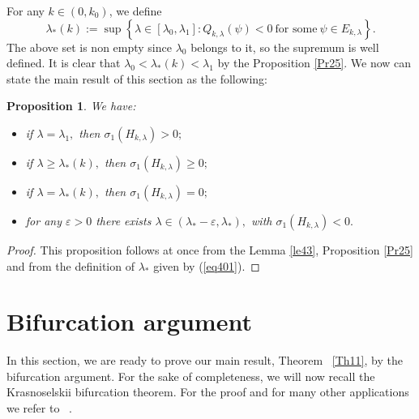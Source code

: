 \documentclass[reqno]{amsart}
\newtheorem{proposition}[theorem]{Proposition}
\def\e{\varepsilon}
\numberwithin{equation}{section}
\newenvironment{key words}{\textbf{Keywords}\mbox{  }}{ }
\begin{document}
For any $k \in (0, k_0)$, we define
\begin{equation}\label{eq401}
\lambda_{\ast}(k):=\sup\left\{\lambda\in[\lambda_{0},\lambda_{1}]:Q_{k, \lambda}(\psi)< 0 ~\mbox
{for some}~\psi\in E_{k, \lambda}\right\}.
\end{equation}
The above set is non empty since $\lambda_0 $ belongs to it, so the supremum is well defined. It is clear that $\lambda_{0}<\lambda_{\ast}(k)<\lambda_{1}$ by the Proposition \ref{Pr25}. We now can state the main result of this section as the following:
\begin{proposition} \label{Pr41}
We have:
\begin{itemize}
		\item[(i)] if $\lambda=\lambda_{1},$ then $\sigma_{1}(H_{k, \lambda})>0;$
        \item[(ii)] if $\lambda \geq \lambda_{\ast}(k),$ then $\sigma_{1}(H_{k, \lambda}) \geq 0;$
        \item[(iii)] if $\lambda = \lambda_{\ast}(k),$ then $\sigma_{1}(H_{k, \lambda}) = 0;$
		\item[(iv)] for any $\e>0$ there exists $\lambda \in (\lambda_{\ast}- \e, \lambda_{\ast}),$ with $\sigma_{1}(H_{k, \lambda})<0.$
	\end{itemize}
 \end{proposition}
\begin{proof} This proposition follows at once from the Lemma \ref{le43}, Proposition \ref{Pr25} and from the definition of $\lambda_{\ast}$ given by (\ref{eq401}).
 \end{proof}

\section{Bifurcation argument}
\label{Section 6}

In this section, we are ready to prove our main result, Theorem ~\ref{Th11}, by the bifurcation argument. For the sake of completeness, we will now recall the Krasnoselskii bifurcation theorem. For the proof and for many other applications we refer to ~\cite{K04,S94}.
\end{document}
